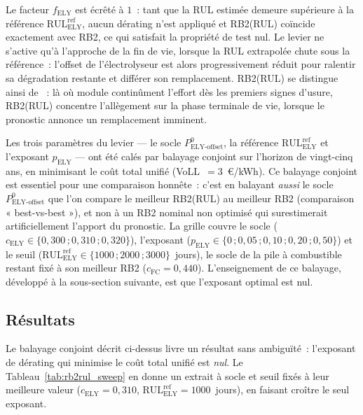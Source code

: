 Le facteur $f_{\text{ELY}}$ est écrêté à $1$~: tant que la RUL estimée demeure supérieure à la référence $\mathrm{RUL}^{\text{ref}}_{\text{ELY}}$, aucun dérating n'est appliqué et RB2(RUL) coïncide exactement avec RB2, ce qui satisfait la propriété de test nul. Le levier ne s'active qu'à l'approche de la fin de vie, lorsque la RUL extrapolée chute sous la référence~: l'offset de l'électrolyseur est alors progressivement réduit pour ralentir sa dégradation restante et différer son remplacement. RB2(RUL) se distingue ainsi de \RBsohH~: là où \RBsohH{} module continûment l'effort dès les premiers signes d'usure, RB2(RUL) concentre l'allègement sur la phase terminale de vie, lorsque le pronostic annonce un remplacement imminent.

Les trois paramètres du levier — le socle $P_{\text{ELY-offset}}^{0}$, la référence $\mathrm{RUL}^{\text{ref}}_{\text{ELY}}$ et l'exposant $p_{\text{ELY}}$ — ont été calés par balayage conjoint sur l'horizon de vingt-cinq ans, en minimisant le coût total unifié (VoLL~$=3$~€/kWh). Ce balayage conjoint est essentiel pour une comparaison honnête~: c'est en balayant \emph{aussi} le socle $P_{\text{ELY-offset}}^{0}$ que l'on compare le meilleur RB2(RUL) au meilleur RB2 (comparaison « best-vs-best »), et non à un RB2 nominal non optimisé qui surestimerait artificiellement l'apport du pronostic. La grille couvre le socle ($c_{\text{ELY}} \in \{0{,}300\,;0{,}310\,;0{,}320\}$), l'exposant ($p_{\text{ELY}} \in \{0\,;0{,}05\,;0{,}10\,;0{,}20\,;0{,}50\}$) et le seuil ($\mathrm{RUL}^{\text{ref}}_{\text{ELY}} \in \{1000\,;2000\,;3000\}$~jours), le socle de la pile à combustible restant fixé à son meilleur RB2 ($c_{\text{FC}} = 0{,}440$). L'enseignement de ce balayage, développé à la sous-section suivante, est que l'exposant optimal est nul.

\subsection{Résultats}

Le balayage conjoint décrit ci-dessus livre un résultat sans ambiguïté~: l'exposant de dérating qui minimise le coût total unifié est \emph{nul}. Le Tableau~\ref{tab:rb2rul_sweep} en donne un extrait à socle et seuil fixés à leur meilleure valeur ($c_{\text{ELY}} = 0{,}310$, $\mathrm{RUL}^{\text{ref}}_{\text{ELY}} = 1000$~jours), en faisant croître le seul exposant.

